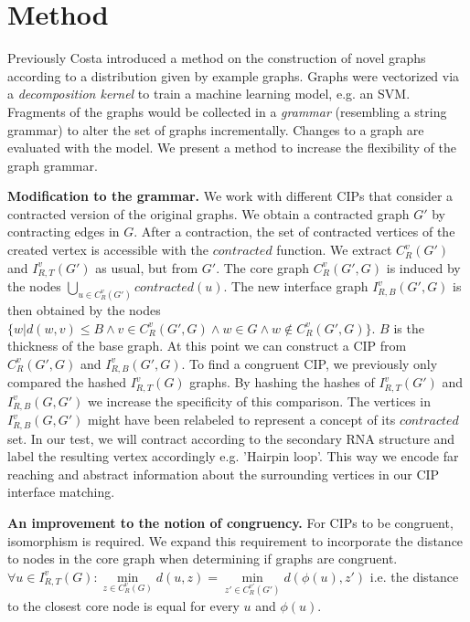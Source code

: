 \documentclass{article}
\begin{document}
\section{Method}
Previously Costa \cite{costa14} introduced a method
on the construction of novel graphs according to a distribution given by
example graphs. Graphs were vectorized via a \emph{decomposition kernel}
to train a machine learning model, e.g. an SVM.
Fragments of the graphs would be collected in 
a \emph{grammar} (resembling a string grammar) to alter the 
set of graphs incrementally. Changes to a graph are evaluated with the model. 
We present a method to increase the flexibility of the graph grammar.


\textbf{Modification to the grammar.}
We work with different CIPs that consider a contracted version
of the original graphs. We obtain a contracted graph $G'$ by contracting edges
in $G$. After a contraction, the set of contracted vertices of the 
created vertex is accessible with the $contracted$ function.
We extract $C_{R}^v(G')$ and $I_{R,T}^v(G')$ as usual, but from $G'$. 
The core graph $C_{R}^v(G',G)$ is induced by the nodes 
$\bigcup\limits_{u \in C_R^v(G')} contracted(u)$.
The new interface graph $I_{R,B}^v(G',G)$ is then obtained by the nodes 
$\{ w | d(w,v) \leq B \wedge v\in C_R^v(G',G) \wedge w \in G \wedge w 
\notin C_R^v(G',G) \}$.  $B$ is the thickness of the base graph. 
At this point we can construct a CIP from $C_R^v(G',G)$ and $I_{R,B}^v(G',G)$. 
To find a congruent CIP, we previously only compared the hashed $I_{R,T}^v(G)$ 
graphs. By hashing the hashes of $I_{R,T}^v(G')$ and $I_{R,B}^v(G,G')$ we 
increase the specificity of this comparison. The vertices in $I_{R,B}^v(G,G')$ 
might have been relabeled to represent a concept of its $contracted$ set. In 
our test, we will contract according to the 
secondary RNA structure and label the resulting vertex accordingly e.g.
'Hairpin loop'. This way we encode far reaching and abstract 
information about the surrounding vertices in our CIP interface matching.



\textbf{An improvement to the notion of congruency.}
For CIPs to be congruent, isomorphism is required. 
We expand this requirement to incorporate
the distance to nodes in the core graph when determining if graphs are 
congruent.
$\forall u \in I_{R,T}^v(G) : 
\underset{z \in  C_{R}^v(G)}{\min} d(u,z) = 
\underset{z' \in  C_{R}^{v'}(G')}{\min} d(\phi(u),z') $ i.e. the distance 
to the closest core node is equal for every
$u$ and $\phi(u)$.
\end{document}
